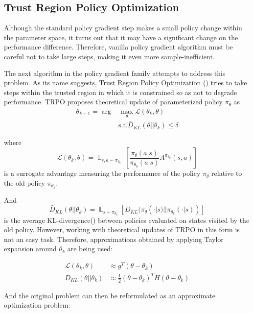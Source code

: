 \subsection{Trust Region Policy Optimization}
Although the standard policy gradient step makes a small policy change within the parameter space, it turns out that it may have a significant change on the performance difference.
Therefore, vanilla policy gradient algorithm must be careful not to take large steps, making it even more sample-inefficient.

The next algorithm in the policy gradient family attempts to address this problem.
As its name suggests, Trust Region Policy Optimization (\cite{TRPO}) tries to take steps within the trusted region in which it is constrained so as not to degrade performance.
TRPO proposes theoretical update of parameterized policy $\pi_\theta$ as
\begin{align*}
  \theta_{k+1} = \arg &\max_\theta \mathcal{L}(\theta_k,\theta)   \\  
  &\text{s.t.}  \bar{D}_{KL}(\theta||\theta_k) \leq \delta
\end{align*}

where \[\mathcal{L}(\theta_k,\theta) = \mathop{\mathbb{E}}_{s,a \sim \pi_{\theta_k}} \ \left[ \frac{\pi_\theta(a|s)}{\pi_{\theta_k}(a|s)}A^{\pi_{\theta_k}} (s,a) \right] \]
is a surrogate advantage measuring the performance of the policy $\pi_\theta$ relative to the old policy $\pi_{\theta_k}$.

And \[\bar{D}_{KL}(\theta||\theta_k) = \mathop{\mathbb{E}}_{s \sim \pi_{\theta_k}}[D_{KL}(\pi_\theta(\cdot|s)||\pi_{\theta_k}(\cdot|s))]\] is the average KL-divergence(\cite{KLDIV}) between policies evaluated on states visited by the old policy.
However, working with theoretical updates of TRPO in this form is not an easy task. 
Therefore, approximations obtained by applying Taylor expansion around $\theta_k$ are being used:

\begin{align*}
  \mathcal{L}(\theta_k,\theta) &\approx g^T(\theta - \theta_k) \\
  \bar{D}_{KL}(\theta||\theta_k) &\approx \frac{1}{2} (\theta-\theta_k)^TH(\theta-\theta_k)
\end{align*}

And the original problem can then be reformulated as an approximate optimization problem:

